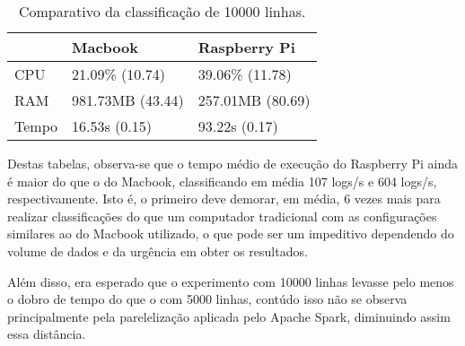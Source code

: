 \begin{table}[!ht]
    \centering
    \begin{tabular}{|l|l|l|}
    \hline
        ~ & Macbook & Raspberry Pi \\ \hline
        CPU & 21.09\% (10.74) & 39.06\% (11.78) \\ \hline
        RAM & 981.73MB (43.44) & 257.01MB (80.69) \\ \hline
        Tempo & 16.53s (0.15) & 93.22s (0.17) \\ \hline
    \end{tabular}

    \caption{Comparativo da classificação de 10000 linhas.\label{tab:comparativo_classificacao_10000}}
\end{table}


Destas tabelas, observa-se que o tempo médio de execução do Raspberry Pi ainda é maior 
do que o do Macbook, classificando em média 107 logs/s e 604 logs/s, respectivamente. Isto é,
o primeiro deve demorar, em média, 6 vezes mais para realizar classificações do que um computador tradicional 
com as configurações similares ao do Macbook utilizado, o que pode ser um impeditivo dependendo do 
volume de dados e da urgência em obter os resultados.

Além disso, era esperado que o experimento com 10000 linhas levasse pelo menos o dobro de tempo
do que o com 5000 linhas, contúdo isso não se observa principalmente pela parelelização 
aplicada pelo Apache Spark, diminuindo assim essa distância.